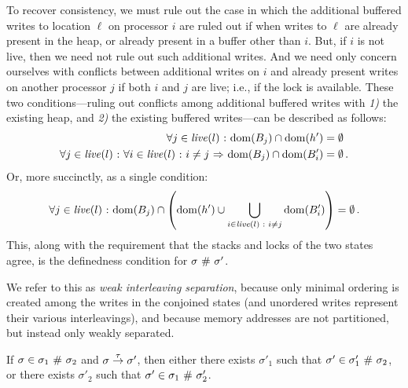 \documentclass[11pt]{report}
\begin{document}
To recover consistency, we must rule out the case in which the additional buffered writes to location $\ell$ on processor $i$ are ruled out if when writes to $\ell$ are already present in the heap, or already present in a buffer other than $i$. But, if $i$ is not live, then we need not rule out such additional writes. And we need only concern ourselves with conflicts between additional writes on $i$ and already present writes on another processor $j$ if both $i$ and $j$ are live; i.e., if the lock is available. These two conditions---ruling out conflicts among additional buffered writes with \emph{1)} the existing heap, and \emph{2)} the existing buffered writes---can be described as follows: \begin{align*}
  \forall j \in  \mathit{live}(l) \operatorname{\,:\,} \operatorname{\mathrm{dom}}(B_j) \cap \operatorname{\mathrm{dom}}(h') & = \operatorname{\emptyset} \\
  \forall j \in  \mathit{live}(l) \operatorname{\,:\,} \forall i \in \mathit{live}(l) \operatorname{\,:\,} i \neq j \operatorname{\,\Rightarrow\,} \operatorname{\mathrm{dom}}(B_j) \cap \operatorname{\mathrm{dom}}(B'_i) & = \operatorname{\emptyset}. \\
\end{align*} Or, more succinctly, as a single condition: \[ \forall j \in \mathit{live}(l) \operatorname{\,:\,} \operatorname{\mathrm{dom}}(B_j) \cap \left( \operatorname{\mathrm{dom}}(h') \cup \bigcup_{i \in \mathit{live}(l) \operatorname{\,:\,} i \neq j} \operatorname{\mathrm{dom}}(B'_i)\right) = \operatorname{\emptyset}. \] 
This, along with the requirement that the stacks and locks of the two states agree, is the definedness condition for $\sigma \operatorname{\,\#\,} \sigma'$.

We refer to this as \emph{weak interleaving separation}, because only minimal ordering is created among the writes in the conjoined states (and unordered writes represent their various interleavings), and because memory addresses are not partitioned, but instead only weakly separated. 

\begin{lemma}
  \label{lem:separation-tau}
  If $\sigma \in \sigma_1 \operatorname{\,\#\,} \sigma_2$ and $\sigma \stackrel{\tau}{\rightarrow} \sigma'$, then either there exists $\sigma'_1$ such that $\sigma' \in \sigma'_1 \operatorname{\,\#\,} \sigma_2$, or there exists $\sigma'_2$ such that $\sigma' \in \sigma_1 \operatorname{\,\#\,} \sigma'_2$.
\end{lemma}
\end{document}
